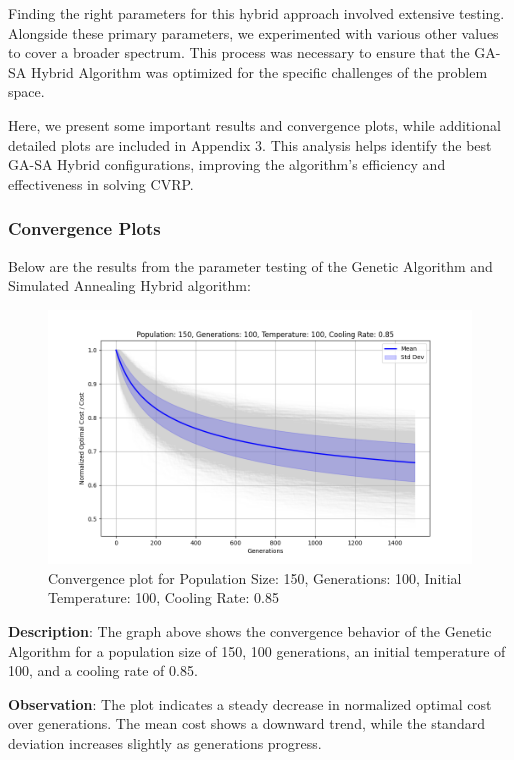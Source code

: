 \documentclass{article}
\begin{document}
    Finding the right parameters for this hybrid approach involved extensive testing. Alongside these primary parameters, we experimented with various other values to cover a broader spectrum. This process was necessary to ensure that the GA-SA Hybrid Algorithm was optimized for the specific challenges of the problem space.

    Here, we present some important results and convergence plots, while additional detailed plots are included in Appendix 3. This analysis helps identify the best GA-SA Hybrid configurations, improving the algorithm's efficiency and effectiveness in solving CVRP.

    \subsubsection{Convergence Plots}
    Below are the results from the parameter testing of the Genetic Algorithm and Simulated Annealing Hybrid algorithm:

    \begin{figure}[H]
        \centering
        \includegraphics[width=\textwidth]{genetic_simulated_annealing_hybrid/Population_150_Generations_100_Temperature_100_CoolingRate_0.85}
        \caption{Convergence plot for Population Size: 150, Generations: 100, Initial Temperature: 100, Cooling Rate: 0.85}
        \label{fig:pop150_gen100_temp100_cr0.85}
    \end{figure}

    \textbf{Description}: The graph above shows the convergence behavior of the Genetic Algorithm for a population size of 150, 100 generations, an initial temperature of 100, and a cooling rate of 0.85.

    \textbf{Observation}: The plot indicates a steady decrease in normalized optimal cost over generations. The mean cost shows a downward trend, while the standard deviation increases slightly as generations progress.
\end{document}
